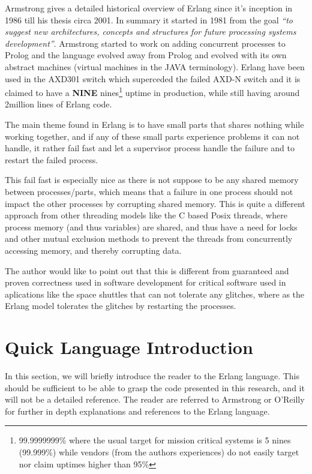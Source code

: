 \documentclass[a4paper,11pt]{report}
\begin{document}
Armstrong \cite{thesis:armstrong} gives a detailed historical overview
of Erlang since it's inception in 1986 till his thesis circa 2001. In
summary it started in 1981 from the goal \emph{``to suggest new
  architectures, concepts and structures for future processing systems
  development''}. Armstrong started to work on adding concurrent
processes to Prolog and the language evolved away from Prolog and
evolved with its own abstract machines (virtual machines in the JAVA
terminology). Erlang have been used in the AXD301 switch which
superceded the failed AXD-N switch and it is claimed to have a
\textbf{NINE} nines\footnote{99.9999999\% where the usual target for
  mission critical systems is 5 nines (99.999\%) while vendors (from
  the authors experiences) do not easily target nor claim uptimes
  higher than 95\%} uptime in production, while still having around
2million lines of Erlang code.

The main theme found in Erlang is to have small parts that shares
nothing while working together, and if any of these small parts
experience problems it can not handle, it rather fail fast and let a
supervisor process handle the failure and to restart the failed
process.

This fail fast is especially nice as there is not suppose to be any
shared memory between processes/parts, which means that a failure in
one process should not impact the other processes by corrupting shared
memory. This is quite a different approach from other threading models
like the C based Posix threads, where process memory (and thus
variables) are shared, and thus have a need for locks and other mutual
exclusion methods to prevent the threads from concurrently accessing
memory, and thereby corrupting data. 

The author would like to point out that this is different from
guaranteed and proven correctness used in software development for
critical software used in aplications like the space shuttles that
can not tolerate any glitches, where as the Erlang model tolerates the
glitches by restarting the processes.

\section{Quick Language Introduction}

In this section, we will briefly introduce the reader to the Erlang
language. This should be sufficient to be able to grasp the code
presented in this research, and  it will not be a detailed
reference. The reader are referred to Armstrong\cite{joe:09} or
O'Reilly\cite{O'reilly} for further in depth explanations and
references to the Erlang language.
\end{document}
